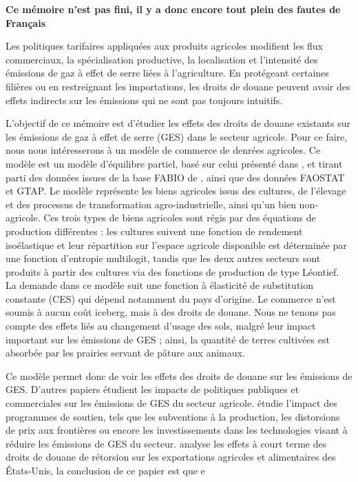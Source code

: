 \textbf{Ce mémoire n'est pas fini, il y a donc encore tout plein des fautes de Français}

Les politiques tarifaires appliquées aux produits agricoles modifient les flux commerciaux, la spécialisation productive, la localisation et l'intensité des émissions de gaz à effet de serre liées à l'agriculture. En protégeant certaines filières ou en restreignant les importations, les droits de douane peuvent avoir des effets indirects sur les émissions qui ne sont pas toujours intuitifs.

L'objectif de ce mémoire est d'étudier les effets des droits de douane existants sur les émissions de gaz à effet de serre (GES) dans le secteur agricole. Pour ce faire, nous nous intéresserons à un modèle de commerce de denrées agricoles. Ce modèle est un modèle d'équilibre partiel, basé sur celui présenté dans \cite{Gouel2021}, et tirant parti des données issues de la base FABIO de \cite{Bruckner2019}, ainsi que des données FAOSTAT et GTAP. Le modèle représente les biens agricoles issus des cultures, de l'élevage et des processus de transformation agro-industrielle, ainsi qu'un bien non-agricole. Ces trois types de biens agricoles sont régis par des équations de production différentes : les cultures suivent une fonction de rendement isoélastique et leur répartition sur l'espace agricole disponible est déterminée par une fonction d'entropie multilogit, tandis que les deux autres secteurs sont produits à partir des cultures via des fonctions de production de type Léontief. La demande dans ce modèle suit une fonction à élasticité de substitution constante (CES) qui dépend notamment du pays d'origine. Le commerce n'est soumis à aucun coût iceberg, mais à des droits de douane. Nous ne tenons pas compte des effets liés au changement d'usage des sols, malgré leur impact important sur les émissions de GES ; ainsi, la quantité de terres cultivées est absorbée par les prairies servant de pâture aux animaux.

Ce modèle permet donc de voir les effets des droits de douane sur les émissions de GES. D'autres papiers étudient les impacts de politiques publiques et commerciales sur les émissions de GES du secteur agricole. \cite{Laborde2020} étudie l'impact des programmes de soutien, tels que les subventions à la production, les distorsions de prix aux frontières ou encore les investissements dans les technologies visant à réduire les émissions de GES du secteur. \cite{Carter2020} analyse les effets à court terme des droits de douane de rétorsion sur les exportations agricoles et alimentaires des États-Unis, la conclusion de ce papier est que e

